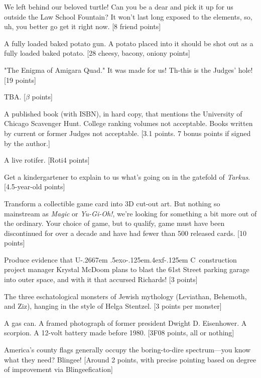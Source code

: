 \documentclass{book}
\def\UofC{U\kern-.2667em \lower.5ex\hbox{o}\kern-.125em\raise.4ex\hbox{f}\kern-.125em C}
\begin{document}
\begin{list}{}{}
\newpage
\item We left behind our beloved turtle! Can you be a dear and pick it up for us outside the Law School
Fountain? It won’t last long exposed to the elements, so, uh, you better go get it right now. [8 friend
points]
\item A fully loaded baked potato gun. A potato placed into it should be shot out as a fully loaded baked potato. [28 cheesy, bacony, oniony points]
\item "The Enigma of Amigara Quad." It was made for us! Th-this is the Judges' hole! [19 points]
\item TBA. [$\beta$ points]%
\item A published book (with ISBN), in hard copy, that mentions the University of Chicago Scavenger Hunt. College ranking volumes not acceptable. Books written by current or former Judges not acceptable. [3.1 points. 7 bonus points if signed by the author.]
\item A live rotifer. [Roti4 points]
\item Get a kindergartener to explain to us what's going on in the gatefold of \textit{Tarkus}. [4.5-year-old points]
\item Transform a collectible game card into 3D cut-out art. But nothing so mainstream as \textit{Magic} or \textit{Yu-Gi-Oh!}, we’re looking for something a bit more out of the ordinary. Your choice of game, but to qualify, game must have been discontinued for over a decade and have had fewer than 500 released cards. [10 points]
\item Produce evidence that \UofC\ construction project manager Krystal McDoom plans to blast the 61st Street parking garage into outer space, and with it that accursed Richards! [3 points]
\item The three eschatological monsters of Jewish mythology (Leviathan, Behemoth, and Ziz), hanging in the style of Helga Stentzel. [3 points per monster]
\item A gas can. A framed photograph of former president Dwight D. Eisenhower. A scorpion. A 12-volt battery made before 1980. [3F08 points, all or nothing]
\item America’s county flags generally occupy the boring-to-dire spectrum—you know what they need? Blingee! [Around 2 points, with precise pointing based on degree of improvement via Blingeefication]

\end{list}
\end{document}
